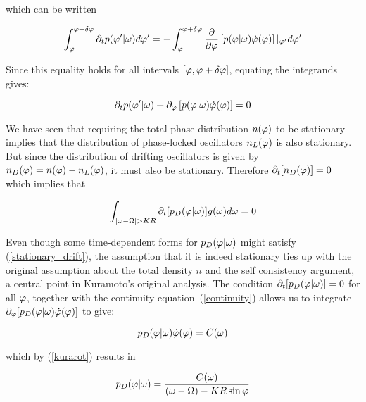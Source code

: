 \noindent which can be written

\begin{align}
	\int_{\varphi}^{\varphi + \delta \varphi}\partial_t p(\varphi' | \omega) d\varphi' =
  -\int_{\varphi}^{\varphi + \delta \varphi} \frac{\partial}{\partial\varphi}\left[ p(\varphi|\omega)\dot{\varphi}(\varphi)
	\right]|_{\varphi'} d\varphi'
\end{align}

\noindent Since this equality holds for all intervals $[\varphi, \varphi+\delta\varphi]$, equating the integrands gives:

\begin{equation}
  \partial_t p(\varphi' | \omega) + \partial_\varphi\left[ p(\varphi|\omega)\dot{\varphi}(\varphi) \right] = 0
	\label{continuity}
\end{equation}

We have seen that requiring the total phase distribution $n(\varphi)$ to be stationary implies that the distribution of phase-locked
oscillators $n_L(\varphi)$ is also stationary. But since the distribution of drifting oscillators is given by $n_D(\varphi) =
n(\varphi) - n_L(\varphi)$, it must also be stationary. Therefore $\partial_t [ n_D(\varphi) ] = 0$ which implies that

\begin{equation}
	\int_{|\omega - \Omega| > K R} \partial_t [ p_D(\varphi | \omega)] g(\omega) d\omega = 0
	\label{stationary_drift}
\end{equation}

Even though some time-dependent forms for $p_D(\varphi | \omega)$ might satisfy (\ref{stationary_drift}), the assumption that it is
indeed stationary ties up with the original assumption about the total density $n$ and the self consistency argument, a central point
in Kuramoto's original analysis. The condition $\partial_t [p_D(\varphi | \omega)]=0$ for all $\varphi$, together with the
continuity equation~(\ref{continuity}) allows us to integrate $\partial_\varphi [p_D(\varphi | \omega)\dot{\varphi}(\varphi)]$
to give:

\begin{equation}
	p_D(\varphi | \omega) \dot{\varphi}(\varphi) = C(\omega) \notag\\
\end{equation}

\noindent which by (\ref{kurarot}) results in

\begin{equation}
	p_D(\varphi | \omega) = \frac{C(\omega)}{(\omega - \Omega) - K R \sin \varphi}
	\label{nD}
\end{equation}

